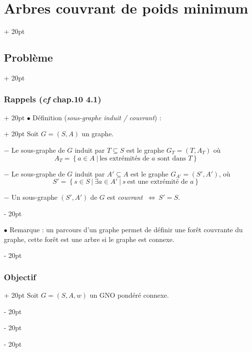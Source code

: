\documentclass[a4paper, 12pt, twoside]{article}
\newcommand{\set}[1]{\left\{ #1 \right\}}
\newcommand{\ssi}{\ \Leftrightarrow \ }
\newcommand{\ind}[1][20pt]{\advance\leftskip + #1}
\newcommand{\deind}[1][20pt]{\advance\leftskip - #1}
\newenvironment{indt}[2][20pt]{#2 \par \ind[#1]}{\par \deind} %
\begin{document}
    \begin{indt}{\section{Arbres couvrant de poids minimum}}
        \begin{indt}{\subsection{Problème}}
            \begin{indt}{\subsubsection{Rappels (\textit{cf} chap.10 4.1)}}
                \begin{indt}{$\bullet$ Définition (\textit{sous-graphe induit / couvrant}) :
}                    Soit $G = (S, A)$ un graphe.

                    $-$ Le sous-graphe de $G$ induit par $T \subseteq S$ est le graphe $G_T = (T, A_T)$ où
                    \[
                        A_T = \set{a \in A\ |\ \text{les extrémités de $a$ sont dans $T$}}
                    \]

                    $-$ Le sous-graphe de $G$ induit par $A' \subseteq A$ est le graphe $G_{A'} = (S', A')$, où 
                    \[
                        S' = \set{s \in S\ |\ \exists a \in A'\ |\ s\ \text{est une extrémité de $a$}}
                    \]

                    $-$ Un sous-graphe $(S', A')$ de $G$ est \textit{couvrant} $\ssi S' = S$.
                \end{indt}

                \vspace{12pt}
                
                $\bullet$ Remarque :
                un parcours d'un graphe permet de définir une forêt couvrante du graphe, cette forêt est une arbre si le graphe est connexe.
            \end{indt}

            \vspace{12pt}
            
            \begin{indt}{\subsubsection{Objectif}}
                Soit $G = (S, A, w)$ un GNO pondéré connexe.


\end{indt}
\end{indt}
\end{indt}
\end{document}
